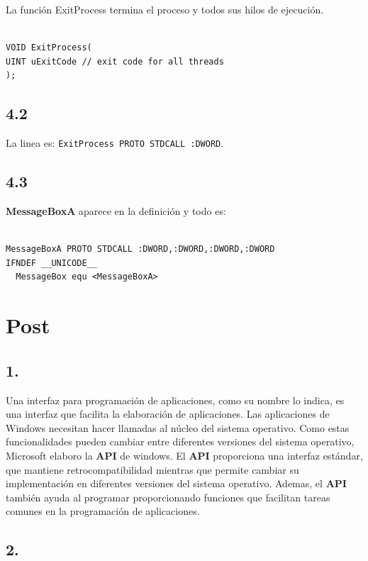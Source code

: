 La función ExitProcess termina el proceso y todos sus hilos de ejecución.

\begin{BVerbatim}

VOID ExitProcess(
UINT uExitCode // exit code for all threads
);

\end{BVerbatim}

\subsection*{4.2}
La linea es:  \verb|ExitProcess PROTO STDCALL :DWORD|.

\subsection*{4.3}
\textbf{MessageBoxA} aparece en la definición y todo es:

\begin{BVerbatim}

MessageBoxA PROTO STDCALL :DWORD,:DWORD,:DWORD,:DWORD
IFNDEF __UNICODE__
  MessageBox equ <MessageBoxA>

\end{BVerbatim}


\section*{Post}

\subsection*{1.}

Una interfaz para programación de aplicaciones, como su nombre lo indica, es
una interfaz que facilita la elaboración de aplicaciones. Las aplicaciones de
Windows necesitan hacer llamadas al núcleo del sistema operativo. Como estas
funcionalidades pueden cambiar entre diferentes versiones del sistema
operativo, Microsoft elaboro la \textbf{API} de windows. El \textbf{API}
proporciona una interfaz estándar, que mantiene retrocompatibilidad mientras
que permite cambiar su implementación en diferentes versiones del sistema
operativo. Ademas, el \textbf{API} también ayuda al programar proporcionando
funciones que facilitan tareas comunes en la programación de aplicaciones.

\subsection*{2.}

